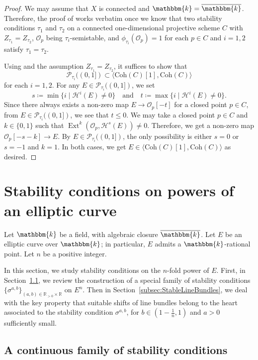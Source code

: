 \documentclass[11pt, reqno]{amsart}
\numberwithin{equation}{section}
\theoremstyle{plain}
\theoremstyle{remark}
\theoremstyle{definition}
\theoremstyle{italicsname}
\newcommand{\Coh}{\mathrm{Coh}}
\DeclareMathOperator{\Ext}{Ext}
\newcommand{\cO}{\mathcal{O}}
\newcommand{\cH}{\mathcal{H}}
\newcommand{\cP}{\mathscr{P}}
\newcommand{\KK}{\mathbbm{k}}
\def\RR{\ensuremath{\mathbb{R}}}
\begin{document}
\begin{proof}
We may assume that $X$ is connected and $\KK=\overline{\KK}$. Therefore, the proof of \cite[Corollary 6.13]{Li:sb} works verbatim once we know that two stability conditions $\tau_1$ and $\tau_2$ on a connected one-dimensional projective scheme $C$ with $Z_{\tau_1}=Z_{\tau_2}$, $\cO_p$ being $\tau_i$-semistable, and $\phi_{\tau_i}(\cO_p)=1$ for each $p\in C$ and $i=1,2$ satisfy $\tau_1=\tau_2$.

Using \cite[Lemma 8.11]{BMS:StabCY3s} and the assumption $Z_{\tau_1}=Z_{\tau_2}$, it suffices to show that
\[
\cP_{\tau_i}((0,1])\subset \langle \Coh(C)[1], \Coh(C)\rangle
\]
for each $i=1,2$. 
For any $E\in \cP_{\tau_i}((0,1])$, we set
\[
s\coloneqq \min \{i\mid \cH^i(E)\neq 0\}\quad \text{and}\quad t\coloneqq \max \{i\mid \cH^i(E)\neq 0\}.
\]
Since there always exists a non-zero map $E\to \cO_p[-t]$ for a closed point $p\in C$, from $E\in \cP_{\tau_i}((0,1])$, we see that $t\leq 0$. 
We may take a closed point $p\in C$ and $k\in \{0,1\}$ such that $\Ext^k(\cO_p, \cH^s(E))\neq 0$. 
Therefore, we get a non-zero map $\cO_p[-s-k]\to E$. By $E\in \cP_{\tau_i}((0,1])$, the only possibility is either $s=0$ or $s=-1$ and $k=1$. 
In both cases, we get $E\in \langle \Coh(C)[1], \Coh(C)\rangle$ as desired.
\end{proof}



\section{Stability conditions on powers of an elliptic curve}\label{sec:ProductEllipticCurves}

Let $\KK$ be a field, with algebraic closure $\overline{\KK}$.
Let $E$ be an elliptic curve over $\KK$; in particular, $E$ admits a $\KK$-rational point.
Let $n$ be a positive integer. 

In this section, we study stability conditions on the $n$-fold power of $E$. 
First, in Section~\ref{subsec:ContinuousFamilyElliptic}, we review the construction of a special family of stability conditions $\{\sigma^{a,b}\}_{(a,b)\in\RR_{>0}\times\RR}$ on $E^n$.
Then in Section~\ref{subsec:StableLineBundles}, we deal with the key property that suitable shifts of line bundles belong to the heart associated to the stability condition $\sigma^{a,b}$, for $b\in(1-\frac{1}{n},1)$ and $a>0$ sufficiently small.

\subsection{A continuous family of stability conditions}\label{subsec:ContinuousFamilyElliptic}
\end{document}
